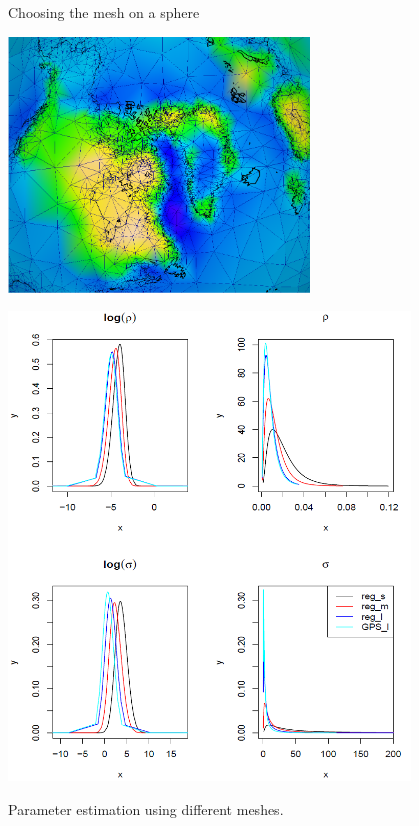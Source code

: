 \documentclass{beamer}
\begin{document}
\begin{frame}{Choosing the mesh on a sphere}
\begin{minipage}[c]{0.4\textwidth}
\includegraphics[width=0.6\textwidth]{images/GIA_mesh2}
\end{minipage}%
\hfill
\begin{minipage}[c]{0.6\textwidth}
\centering
\includegraphics[width=0.8\textwidth]{images/mesh_pars}

\footnotesize{Parameter estimation using different meshes.}
\end{minipage}%

\end{frame}
\end{document}
